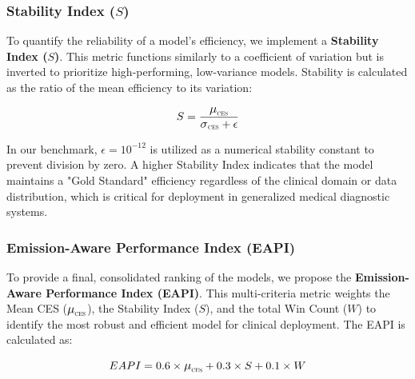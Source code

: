 \documentclass[conference]{IEEEtran}
\newcommand{\muCES}{\scalebox{1.1}{$\mu$}_{\scalebox{0.5}{CES}}}
\newcommand{\sigmaCES}{\scalebox{1.1}{$\sigma$}_{\scalebox{0.5}{CES}}}
\begin{document}
\subsubsection{Stability Index ($S$)}
To quantify the reliability of a model's efficiency, we implement a \textbf{Stability Index ($S$)}. This metric functions similarly to a coefficient of variation but is inverted to prioritize high-performing, low-variance models. Stability is calculated as the ratio of the mean efficiency to its variation:

\vspace{-0.5ex}
\begin{equation}
    S = \frac{\muCES}{\sigmaCES + \epsilon}
\end{equation}
\vspace{-0.5ex}

In our benchmark, $\epsilon = 10^{-12}$ is utilized as a numerical stability constant to prevent division by zero. A higher Stability Index indicates that the model maintains a "Gold Standard" efficiency regardless of the clinical domain or data distribution, which is critical for deployment in generalized medical diagnostic systems.

\subsubsection{Emission-Aware Performance Index (EAPI)}
To provide a final, consolidated ranking of the models, we propose the \textbf{Emission-Aware Performance Index (EAPI)}. This multi-criteria metric weights the Mean CES ($\muCES$), the Stability Index ($S$), and the total Win Count ($W$) to identify the most robust and efficient model for clinical deployment. The EAPI is calculated as:

\vspace{-0.5ex}
\begin{equation}
    EAPI = 0.6 \times \muCES + 0.3 \times S + 0.1 \times W
\end{equation}
\vspace{-0.5ex}
\end{document}
